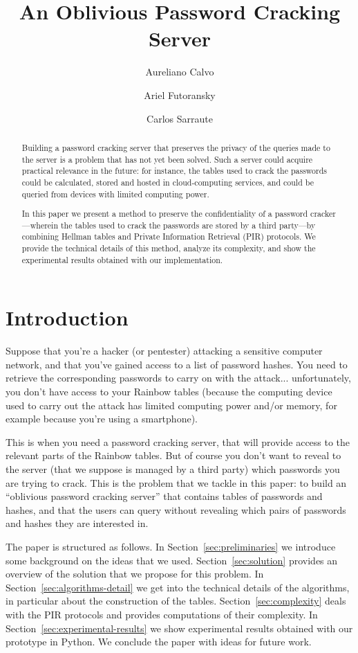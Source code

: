 \documentclass{llncs}
\title{An Oblivious Password Cracking Server}
\author{Aureliano Calvo\inst{1} 
  \and Ariel Futoransky\inst{1}
  \and Carlos Sarraute\inst{1,2}}
\institute{CoreLabs Research Center, Buenos Aires, Argentina
\and 
ITBA (Instituto Tecnol\'ogico de Buenos Aires)
}
\begin{document}
\maketitle
\begin{abstract}
Building a password cracking server that preserves the privacy of the queries 
made to the server is a problem that has not yet been solved.
Such a server could acquire practical relevance in the future:
for instance, the tables used to crack the passwords could be calculated, stored and
hosted in cloud-computing services, and could be queried from 
devices with limited computing power.

In this paper we present a method to preserve the confidentiality of
a password cracker---wherein the tables used to crack the passwords
are stored by a third party---by combining Hellman tables and Private
Information Retrieval (PIR) protocols. 
We provide the technical details of this method,
analyze its complexity,
and show the experimental results obtained with our implementation.
\end{abstract}


\section{Introduction}

Suppose that you're a hacker (or pentester) attacking a sensitive computer network,
and that you've gained access to a list of password hashes.
You need to retrieve the corresponding passwords to carry on with the attack...
unfortunately, you don't have access to your Rainbow tables 
(because the computing device used to carry out the attack has limited computing power
and/or memory, for example because you're using a smartphone).

This is when you need a password cracking server, that will
provide access to the relevant parts of the Rainbow tables.
But of course you don't want to reveal to the server 
(that we suppose is managed by a third party) which passwords you are trying to crack.
This is the problem that we tackle in this paper: 
to build an ``oblivious password cracking server'' that contains
tables of passwords and hashes, and that the users can query 
without revealing which pairs of passwords and hashes they are interested in.

The paper is structured as follows.
In Section~\ref{sec:preliminaries} we introduce some background
on the ideas that we used.
Section~\ref{sec:solution} provides an overview of the solution
that we propose for this problem.
In Section~\ref{sec:algorithms-detail} we get into the technical details
of the algorithms, in particular about the construction of the tables.
Section~\ref{sec:complexity} deals with the PIR protocols
and provides computations of their complexity.
In Section~\ref{sec:experimental-results} we show experimental results
obtained with our prototype in Python.
We conclude the paper with ideas for future work.
\end{document}
